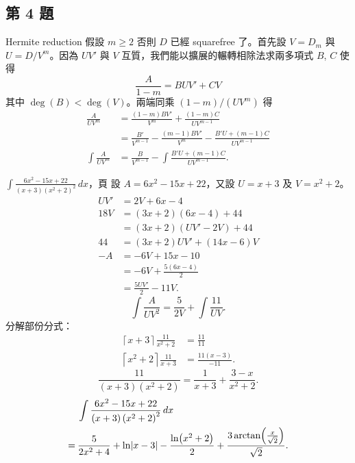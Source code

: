 \documentclass{beamer}
\newcommand{\Left} {\mathopen{}\mathclose\bgroup\left}
\newcommand{\Right}{\aftergroup\egroup\right}
\theoremstyle{remark}
\begin{document}
\begin{CJK}{UTF8}{bsmi}
\section{第 4 題}
\begin{frame}{Hermite reduction}
  假設 $m \ge 2$ 否則 $D$ 已經 squarefree 了。首先設 $V = D_m$ 與 $U = D/V^m$。因為 $UV'$ 與 $V$
  互質，我們能以擴展的輾轉相除法求兩多項式 $B$, $C$ 使得
  \[\frac{A}{1-m} = BUV' + CV\]
  其中 $\deg(B) < \deg(V)$。兩端同乘 $(1-m)/(UV^m)$ 得
  \begin{align*}
    \frac{A}{UV^m} &= \frac{\left( 1-m \right) BV'}{V^m} + \frac{\left( 1-m \right) C}{UV^{m-1}}\\
      &= \frac{B'}{V^{m-1}} - \frac{\left( m-1 \right) BV'}{V^m} - \frac{B'U + \left( m-1 \right) C}{UV^{m-1}}\\
    \int \frac{A}{UV^m} &= \frac{B}{V^{m-1}} - \int \frac{B'U + \left( m-1 \right) C}{UV^{m-1}}.
  \end{align*}
\end{frame}

\begin{frame}[allowframebreaks]{$\displaystyle \int \frac{6x^2 - 15x + 22}{(x+3) \left( x^2 + 2 \right)^2}\,dx$，頁}
  設 $A = 6x^2 - 15x + 22$，又設 $U = x+3$ 及 $V = x^2 + 2$。
  \begin{align*}
    UV' &= 2V + 6x - 4\\
    18V &= (3x + 2) \left( 6x - 4 \right) + 44\\
	&= (3x + 2) \left( UV' - 2V \right) + 44\\
    44  &= \left( 3x + 2 \right) UV' + \left( 14x - 6 \right) V\\
    -A  &= -6V + 15x - 10\\
	&= -6V + \frac{5 \left( 6x - 4 \right)}{2}\\
	&= \frac{5UV'}{2} - 11V.
  \end{align*}
  \[\int \frac{A}{UV^2} = \frac{5}{2V} + \int \frac{11}{UV}.\]
  分解部份分式：
  \begin{align*}
    \left\lceil x + 3 \right\rceil   \frac{11}{x^2 + 2} &= \frac{11}{11}\\
    \left\lceil x^2 + 2 \right\rceil \frac{11}{x   + 3} &= \frac{11 \left( x-3 \right)}{-11}.
  \end{align*}
  \[\frac{11}{(x+3) \left( x^2 + 2 \right)} = \frac{1}{x+3} + \frac{3-x}{x^2 + 2}.\]
  \begin{align*}
       & \int \frac{6x^2 - 15x + 22}{(x+3) \left( x^2 + 2 \right)^2}\,dx\\
    =\:& \frac{5}{2x^2 + 4} + \ln \Left| x-3 \Right| - \frac{\ln \Left( x^2 + 2 \Right)}{2}
	 +\frac{3 \arctan \Left( \frac{x}{\sqrt2} \Right)}{\sqrt2}.
  \end{align*}
\end{frame}


\end{CJK}
\end{document}
